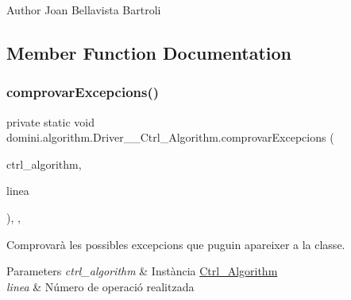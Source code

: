 \begin{DoxyAuthor}{Author}
Joan Bellavista Bartroli 
\end{DoxyAuthor}


\subsection{Member Function Documentation}
\mbox{\label{classdomini_1_1algorithm_1_1Driver____Ctrl__Algorithm_a38ad7761ecde80325d83ce2d2597a61b}} 
\subsubsection{\texorpdfstring{comprovar\+Excepcions()}{comprovarExcepcions()}}
{\footnotesize\ttfamily private static void domini.\+algorithm.\+Driver\+\_\+\+\_\+\+Ctrl\+\_\+\+Algorithm.\+comprovar\+Excepcions (\begin{DoxyParamCaption}\item[{\hyperlink{classdomini_1_1algorithm_1_1Ctrl__Algorithm}{Ctrl\+\_\+\+Algorithm}}]{ctrl\+\_\+algorithm,  }\item[{String}]{linea }\end{DoxyParamCaption})\hspace{0.3cm}{\ttfamily [inline]}, {\ttfamily [static]}, {\ttfamily [private]}}



Comprovarà les possibles excepcions que puguin apareixer a la classe. 


\begin{DoxyParams}{Parameters}
{\em ctrl\+\_\+algorithm} & Instància \hyperlink{classdomini_1_1algorithm_1_1Ctrl__Algorithm}{Ctrl\+\_\+\+Algorithm} \\
\hline
{\em linea} & Número de operació realitzada \\
\hline
\end{DoxyParams}

